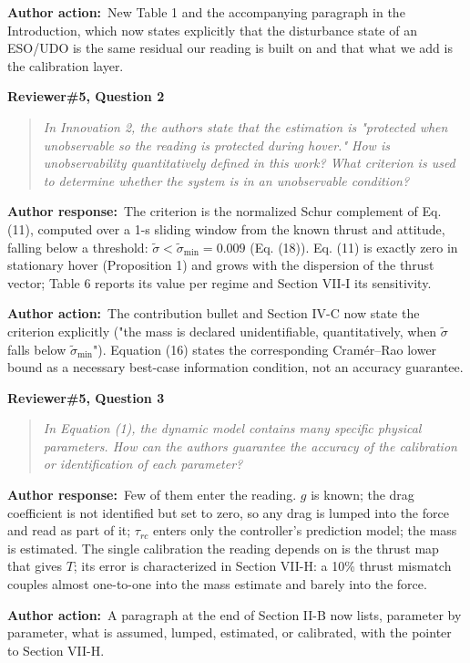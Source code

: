 \documentclass[11pt]{article}
\newcommand{\concern}[1]{\par\medskip\noindent\colorbox{gray!12}{\parbox{\dimexpr\linewidth-2\fboxsep}{\textbf{#1}}}\par\smallskip}
\newcommand{\rlabel}[1]{\par\textbf{#1}\ }
\begin{document}
\rlabel{Author action:}New Table 1 and the accompanying paragraph in the Introduction, which now states explicitly that the disturbance state of an ESO/UDO is the same residual our reading is built on and that what we add is the calibration layer.

\concern{Reviewer\#5, Question 2}

\begin{quote}\itshape In Innovation 2, the authors state that the estimation is "protected when unobservable so the reading is protected during hover." How is unobservability quantitatively defined in this work? What criterion is used to determine whether the system is in an unobservable condition?\end{quote}

\rlabel{Author response:}The criterion is the normalized Schur complement of Eq. (11), computed over a 1-s sliding window from the known thrust and attitude, falling below a threshold: $\tilde\sigma < \tilde\sigma_{\min} = 0.009$ (Eq. (18)). Eq. (11) is exactly zero in stationary hover (Proposition 1) and grows with the dispersion of the thrust vector; Table 6 reports its value per regime and Section VII-I its sensitivity.

\rlabel{Author action:}The contribution bullet and Section IV-C now state the criterion explicitly ("the mass is declared unidentifiable, quantitatively, when $\tilde\sigma$ falls below $\tilde\sigma_{\min}$"). Equation (16) states the corresponding Cram\'er--Rao lower bound as a necessary best-case information condition, not an accuracy guarantee.

\concern{Reviewer\#5, Question 3}

\begin{quote}\itshape In Equation (1), the dynamic model contains many specific physical parameters. How can the authors guarantee the accuracy of the calibration or identification of each parameter?\end{quote}

\rlabel{Author response:}Few of them enter the reading. $g$ is known; the drag coefficient is not identified but set to zero, so any drag is lumped into the force and read as part of it; $\tau_{rc}$ enters only the controller's prediction model; the mass is estimated. The single calibration the reading depends on is the thrust map that gives $T$; its error is characterized in Section VII-H: a 10\% thrust mismatch couples almost one-to-one into the mass estimate and barely into the force.

\rlabel{Author action:}A paragraph at the end of Section II-B now lists, parameter by parameter, what is assumed, lumped, estimated, or calibrated, with the pointer to Section VII-H.
\end{document}
